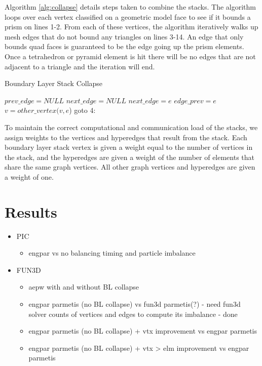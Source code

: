 \documentclass[conference]{IEEEtran}
\begin{document}
Algorithm \ref{alg:collapse} details steps taken to
combine the stacks. The algorithm loops over each vertex classified on a geometric
model face to see if it bounds a prism on lines 1-2. From each of these vertices, the
algorithm iteratively walks up mesh edges that do not bound any triangles on lines 3-14. An edge
that only bounds quad faces is guaranteed to be the edge going up the prism elements. Once
a tetrahedron or pyramid element is hit there will be no edges that are not adjacent to a triangle
and the iteration will end.
\begin{algorithm}
  \caption{Boundary Layer Stack Collapse}
  \label{alg:collapse}
  \small
  \begin{algorithmic}[1]
    \State $prev\_edge = NULL$
    \State $next\_edge = NULL$
    \State $next\_edge = e$
    \EndIf
    \EndFor
    \State $edge\_prev = e$
    \State $v = other\_vertex(v,e$)
    \State goto 4:
    \EndIf
    \EndIf
    \EndFor
  \end{algorithmic}
\end{algorithm}

To maintain the correct computational and communication load of the stacks,
we assign weights to the vertices and hyperedges that result from the stack. Each boundary layer
stack vertex is given a weight equal to the number of vertices in the stack, and the hyperedges
are given a weight of the number of elements that share the same graph vertices. All other
graph vertices and hyperedges are given a weight of one.


\section{Results}
\begin{itemize}
\item PIC
\begin{itemize}
  \item engpar vs no balancing timing and particle imbalance
\end{itemize}
\item FUN3D
\begin{itemize}
  \item aepw with and without BL collapse
  \item engpar parmetis (no BL collapse) vs fun3d parmetis(?) - need fun3d 
    solver counts of vertices and edges to compute its imbalance - done
  \item engpar parmetis (no BL collapse) + vtx improvement vs engpar parmetis
  \item engpar parmetis (no BL collapse) + vtx > elm improvement vs engpar parmetis
\end{itemize}
\end{itemize}
\end{document}
